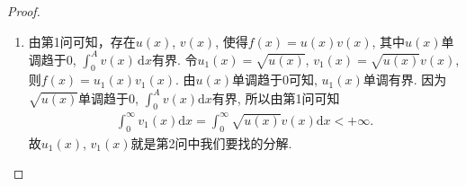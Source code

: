 \documentclass[../../main.tex]{subfiles}%
\begin{document}
\begin{proof}
\begin{enumerate}
\item 由第1问可知，存在$u(x)$, $v(x)$, 使得$f(x)=u(x)v(x)$, 其中$u(x)$单调趋于0, $\int_0^A v(x)\,\mathrm{d}x$有界. 令$u_1(x)=\sqrt{u(x)}$, $v_1(x)=\sqrt{u(x)}v(x)$, 则$f(x)=u_1(x)v_1(x)$. 由$u(x)$单调趋于0可知, $u_1(x)$单调有界. 因为$\sqrt{u(x)}$单调趋于0, $\int_0^A v(x)\mathrm{d}x$有界, 所以由第1问可知
\begin{align*}
\int_0^{\infty} v_1(x)\mathrm{d}x=\int_0^{\infty} \sqrt{u(x)}v(x)\mathrm{d}x<+\infty.
\end{align*}
故$u_1(x)$, $v_1(x)$就是第2问中我们要找的分解.
\end{enumerate}
\end{proof}
\end{document}
